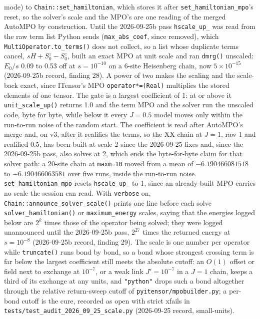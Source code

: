 \documentclass[11pt]{article}
\begin{document}
mode) to \texttt{Chain::set\_hamiltonian}, which stores it after
\texttt{set\_hamiltonian\_mpo}'s reset, so the solver's scale and the
MPO's are one reading of the merged AutoMPO by construction. Until the
2026-09-25b pass \texttt{hscale\_up\_} was read from the raw term list
Python sends (\texttt{max\_abs\_coef}, since removed), which
\texttt{MultiOperator.to\_terms()} does not collect, so a list whose
duplicate terms cancel, $sH+S^z_0-S^z_0$, built an exact MPO at unit
scale and ran \texttt{dmrg()} unscaled: $E_0/s$ 0.09 to 0.53 off at
$s=10^{-10}$ on a 6-site Heisenberg chain, now $5\times10^{-15}$
(2026-09-25b record, finding 28). A power of two makes the scaling and the
scale-back exact, since ITensor's MPO \texttt{operator*=(Real)} multiplies
the stored elements of one tensor. The gate is a largest coefficient of
1: at or above it \texttt{unit\_scale\_up()} returns 1.0 and the term MPO
and the solver run the unscaled code, byte for byte, while below it every
$J=0.5$ model moves only within the run-to-run noise of the random start.
The coefficient is read after AutoMPO's merge and, on v3, after it
realifies the terms, so the XX chain at $J=1$, raw 1 and realified 0.5,
has been built at scale 2 since the 2026-09-25 fixes and, since the
2026-09-25b pass, also solves at 2, which ends the byte-for-byte claim for
that solver path: a 20-site chain at \texttt{maxm=10} moved from a mean
of $-6.190466081518$ to $-6.190466063581$ over five runs, inside the
run-to-run noise. \texttt{set\_hamiltonian\_mpo} resets
\texttt{hscale\_up\_} to 1, since an already-built MPO carries no scale
the session can read. With \texttt{verbose} on,
\texttt{Chain::announce\_solver\_scale()} prints one line before each
solve \texttt{solver\_hamiltonian()} or \texttt{maximum\_energy} scales,
saying that the energies logged below are $2^k$ times those of the
operator being solved; they were logged unannounced until the
2026-09-25b pass, $2^{27}$ times the returned energy at $s=10^{-8}$
(2026-09-25b record, finding 29). The scale is one number per operator while
\texttt{truncate()} runs bond by bond, so a bond whose strongest
crossing term is far below the largest coefficient still meets the
absolute cutoff: an $O(1)$ offset or field next to exchange at
$10^{-7}$, or a weak link $J'=10^{-7}$ in a $J=1$ chain, keeps a third
of its exchange at any units, and \texttt{"python"} drops such a bond
altogether through the relative return-sweep cutoff of
\texttt{pyitensor/mpobuilder.py}; a per-bond cutoff is the cure,
recorded as open with strict xfails in
\texttt{tests/test\_audit\_2026\_09\_25\_scale.py} (2026-09-25 record,
small-units).
\end{document}
